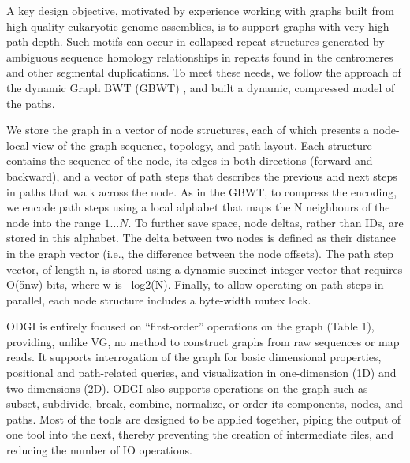 \documentclass{bioinfo}
\begin{document}


A key design objective, motivated by experience working with graphs built from high quality eukaryotic genome assemblies, is to support graphs with very high path depth.
Such motifs can occur in collapsed repeat structures generated by ambiguous sequence homology relationships in repeats found in the centromeres and other segmental duplications.
To meet these needs, we follow the approach of the dynamic Graph BWT (GBWT) \citep{Siren:2020}, and built a dynamic, compressed model of the paths.

We store the graph in a vector of node structures, each of which presents a node-local view of the graph sequence, topology, and path layout.
Each structure contains the sequence of the node, its edges in both directions (forward and backward), and a vector of path steps that describes the previous and next steps in paths that walk across the node.
As in the GBWT, to compress the encoding, we encode path steps using a local alphabet that maps the N neighbours of the node into the range $1\ldots N$.
To further save space, node deltas, rather than IDs, are stored in this alphabet.
The delta between two nodes is defined as their distance in the graph vector (i.e., the difference between the node offsets).
The path step vector, of length n, is stored using a dynamic succinct integer vector that requires O(5nw) bits, where w is ~log2(N).
Finally, to allow operating on path steps in parallel, each node structure includes a byte-width mutex lock.


ODGI is entirely focused on “first-order” operations on the graph (Table 1), providing, unlike VG, no method to construct graphs from raw sequences or map reads.
It supports interrogation of the graph for basic dimensional properties, positional and path-related queries, and visualization in one-dimension (1D) and two-dimensions (2D).
ODGI also supports operations on the graph such as subset, subdivide, break, combine, normalize, or order its components, nodes, and paths.
Most of the tools are designed to be applied together, piping the output of one tool into the next, thereby preventing the creation of intermediate files, and reducing the number of IO operations.
\end{document}

